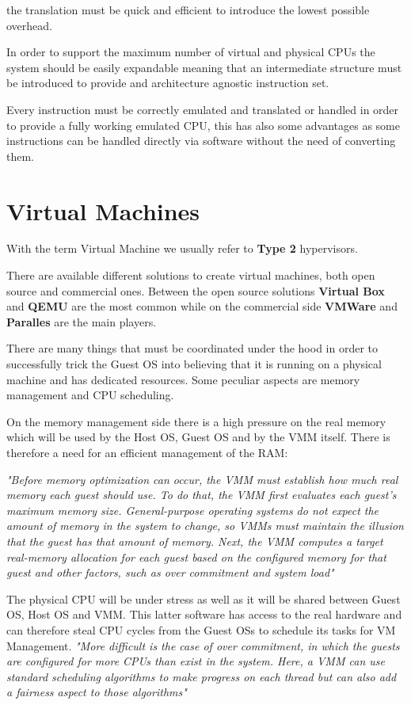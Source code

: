 the translation must be quick and efficient to introduce the lowest possible overhead.

In order to support the maximum number of virtual and physical CPUs the system should be easily expandable meaning that an intermediate structure must be introduced to provide and architecture agnostic instruction set.

Every instruction must be correctly emulated and translated or handled in order to provide a fully working emulated CPU, this has also some advantages as some instructions can be handled directly via software without the need of converting them.

\section{Virtual Machines}

With the term Virtual Machine we usually refer to \textbf{Type 2} hypervisors.

There are available different solutions to create virtual machines, both open source and commercial ones. Between the open source solutions \textbf{Virtual Box} and \textbf{QEMU} are the most common while on the commercial side \textbf{VMWare} and \textbf{Paralles} are the main players. 

There are many things that must be coordinated under the hood in order to successfully trick the Guest OS into believing that it is running on a physical machine and has dedicated resources. Some peculiar aspects are memory management and CPU scheduling.

On the memory management side there is a high pressure on the real memory which will be used by the Host OS, Guest OS and by the VMM itself. There is therefore a need for an efficient management of the RAM:

\textit{"Before memory optimization can occur, the VMM must establish how much real memory each guest should use. To do that, the VMM first evaluates each guest’s maximum memory size. General-purpose operating systems do not expect the amount of memory in the system to change, so VMMs must maintain the illusion that the guest has that amount of memory. Next, the VMM computes a target real-memory allocation for each guest based on the configured memory for that guest and other factors, such as over commitment and system load"}\cite{os}

The physical CPU will be under stress as well as it will be shared between Guest OS, Host OS and VMM. This latter software has access to the real hardware and can therefore steal CPU cycles from the Guest OSs to schedule its tasks for VM Management.
\textit{"More difficult is the case of over commitment, in which the guests are configured for more CPUs than exist in the system. Here, a VMM can use standard scheduling algorithms to make progress on each thread but can also add a fairness aspect to those algorithms"}\cite{os}

